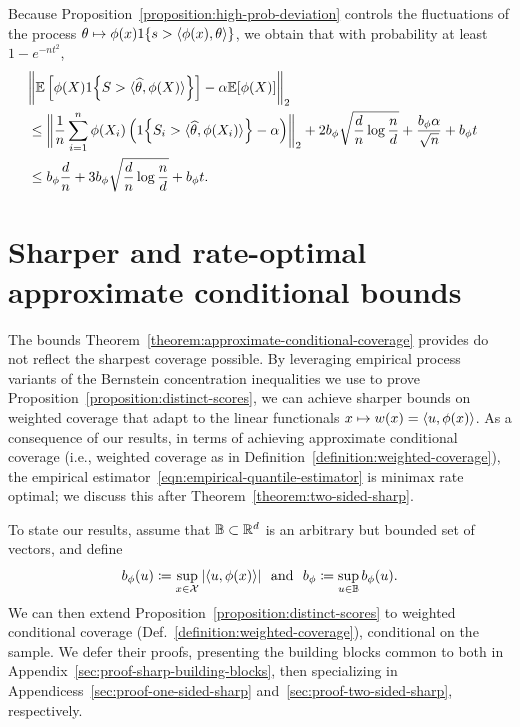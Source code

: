 \documentclass{article}
\newcommand{\radphi}{b_{\phi}}
\newcommand{\scorefunc}{s}
\newcommand{\scoreval}{\scorefunc}
\newcommand{\scorerv}{S}
\begin{document}
Because Proposition~\ref{proposition:high-prob-deviation}
controls the fluctuations of the process $\theta
\mapsto \phi(x) \indic{\scoreval > \<\phi(x), \theta\>}$,
we obtain that with probability at least
$1 - e^{-nt^2}$,
\begin{align*}
  \lefteqn{\ltwobigg{\E\left[\phi(X)
        \indic{\scorerv > \<\what{\theta}, \phi(X)\>}\right]
      - \alpha \E[\phi(X)]}} \\
  & \le
  \ltwobigg{\frac{1}{n} \sum_{i = 1}^n
    \phi(X_i) \left(
    \indic{\scorerv_i > \<\what{\theta}, \phi(X_i)\>} - \alpha
    \right)}
  + 2 \radphi \sqrt{\frac{d}{n} \log \frac{n}{d}}
  + \frac{\radphi \alpha}{\sqrt{n}} + \radphi t \\
  & \le \radphi \frac{d}{n} + 3 \radphi \sqrt{\frac{d}{n} \log \frac{n}{d}}
  + \radphi t.
\end{align*}

\section{Sharper and rate-optimal approximate conditional bounds}

The bounds Theorem~\ref{theorem:approximate-conditional-coverage} provides
do not reflect the sharpest coverage possible.
%
By leveraging empirical process variants of the
Bernstein concentration inequalities we use to prove
Proposition~\ref{proposition:distinct-scores},
we can achieve sharper bounds on weighted coverage that adapt to the
linear functionals $x \mapsto w(x) = \langle u, \phi(x)\rangle$.
%
As a consequence of our results, in terms of achieving approximate
conditional coverage (i.e., weighted coverage as in
Definition~\ref{definition:weighted-coverage}),
the empirical estimator~\eqref{eqn:empirical-quantile-estimator}
is minimax rate optimal; we discuss this
after Theorem~\ref{theorem:two-sided-sharp}.

To state our results, assume that $\mathbb{B} \subset \mathbb{R}^d$ is an arbitrary but
bounded set of vectors, and define
\begin{equation*}
  \radphi(u) \defeq \sup_{x \in \mc{X}} |\<u, \phi(x)\>|
  ~~ \mbox{and} ~~
  \radphi \defeq \sup_{u \in \ball} \radphi(u).
\end{equation*}
We can then extend Proposition~\ref{proposition:distinct-scores} to weighted
conditional coverage (Def.~\ref{definition:weighted-coverage}), conditional
on the sample.
%
We defer their proofs, presenting the building blocks
common to both in Appendix~\ref{sec:proof-sharp-building-blocks},
then specializing in Appendicess~\ref{sec:proof-one-sided-sharp}
and~\ref{sec:proof-two-sided-sharp}, respectively.
\end{document}
